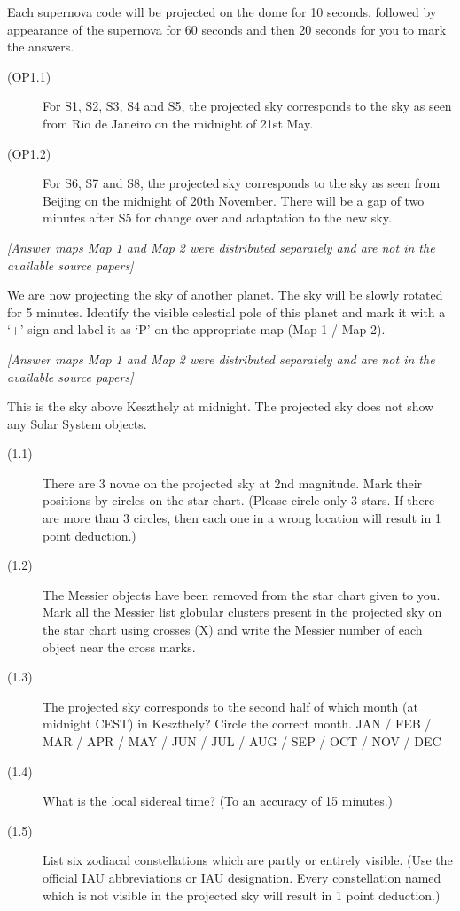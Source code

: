 Each supernova code will be projected on the dome for 10 seconds, followed
by appearance of the supernova for 60 seconds and then 20 seconds for you to
mark the answers.

\begin{description}
\item[(OP1.1)] For S1, S2, S3, S4 and S5, the projected sky corresponds to
  the sky as seen from Rio de Janeiro on the midnight of 21st May.
\item[(OP1.2)] For S6, S7 and S8, the projected sky corresponds to the sky
  as seen from Beijing on the midnight of 20th November. There will be a gap
  of two minutes after S5 for change over and adaptation to the new sky.
\end{description}

\textit{[Answer maps Map 1 and Map 2 were distributed separately and are not in the available source papers]}

We are now projecting the sky of another planet. The sky will be slowly
rotated for 5 minutes. Identify the visible celestial pole of this planet
and mark it with a `+' sign and label it as `P' on the appropriate map
(Map 1 / Map 2).

\textit{[Answer maps Map 1 and Map 2 were distributed separately and are not in the available source papers]}

This is the sky above Keszthely at midnight. The projected sky does not show
any Solar System objects.

\begin{description}
\item[(1.1)] There are 3 novae on the projected sky at 2nd magnitude. Mark
  their positions by circles on the star chart. (Please circle only 3 stars.
  If there are more than 3 circles, then each one in a wrong location will
  result in 1 point deduction.)
\item[(1.2)] The Messier objects have been removed from the star chart given
  to you. Mark all the Messier list globular clusters present in the
  projected sky on the star chart using crosses (X) and write the Messier
  number of each object near the cross marks.
\item[(1.3)] The projected sky corresponds to the second half of which month
  (at midnight CEST) in Keszthely? Circle the correct month.
  JAN / FEB / MAR / APR / MAY / JUN / JUL / AUG / SEP / OCT / NOV / DEC
\item[(1.4)] What is the local sidereal time? (To an accuracy of 15
  minutes.)
\item[(1.5)] List six zodiacal constellations which are partly or entirely
  visible. (Use the official IAU abbreviations or IAU designation. Every
  constellation named which is not visible in the projected sky will result
  in 1 point deduction.)
\end{description}

